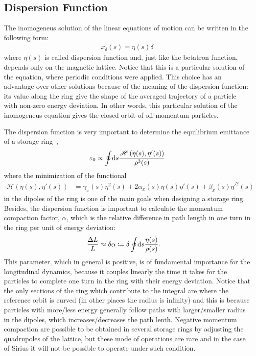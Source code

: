 \subsection{Dispersion Function}

	The inomogeneus solution of the linear equations of motion can be written in the following form:
	\begin{align}\label{eq:dispersion_function}
		x_\delta(s) = \eta(s)\delta
	\end{align}
	where $\eta(s)$ is called dispersion function and, just like the betatron function, depends only on the magnetic lattice. Notice that this is a particular solution of the equation, where periodic conditions were applied. This choice has an advantage over other solutions because of the meaning of the dispersion function: its value along the ring give the shape of the averaged trajectory of a particle with non-zero energy deviation. In other words, this particular solution of the inomogeneus equation gives the closed orbit of off-momentum particles.

	The dispersion function is very important to determine the equilibrium emittance of a storage ring~\cite[pp. 304]{WiedemannBook},
    \begin{align}
        \varepsilon_0 \propto \oint\!\text{d}s \frac{\mathscr{H}\left(\eta(s),\eta'(s)\right)}{\rho^3(s)}
    \end{align}
     where the minimization of the functional
	\begin{align}
		\mathscr{H}(\eta(s), \eta'(s)) &= \gamma_x(s)\eta^2(s) +
										2\alpha_x(s)\eta(s)\eta'(s) +
										 \beta_x(s)\eta'^2(s)
	\end{align}
	in the dipoles of the ring is one of the main goals when designing a storage ring. Besides, the dispersion function is important to calculate the momentum compaction factor, $\alpha$, which is the relative difference in path length in one turn in the ring per unit of energy deviation:
	\begin{align}\label{eq:momentum_compaction}
		\frac{\Delta L}{L} &\approx \delta \alpha \coloneqq \delta \oint\!\text{d}s \frac{\eta(s)}{\rho(s)}.
	\end{align}
	This parameter, which in general is positive, is of fundamental importance for the longitudinal dynamics, because it couples linearly the time it takes for the particles to complete one turn in the ring with their energy deviation. Notice that the only sections of the ring which contribute to the integral are where the reference orbit is curved (in other places the radius is infinity) and this is because particles with more/less energy generally follow paths with larger/smaller radius in the dipoles, which increases/decreases the path lenth. Negative momentum compaction are possible to be obtained in several storage rings by adjusting the quadrupoles of the lattice, but these mode of operations are rare and in the case of Sirius it will not be possible to operate under such condition.

